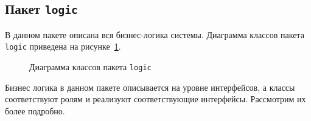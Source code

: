 	\subsection{Пакет \texttt{logic}}
	В данном пакете описана вся бизнес-логика системы. Диаграмма классов пакета \texttt{logic} приведена на рисунке~\ref{fig:logicDiagram}.
	\begin{figure}[h]
		\caption{Диаграмма классов пакета \texttt{logic}}
		\label{fig:logicDiagram}
	\end{figure}
	
	Бизнес логика в данном пакете описывается на уровне интерфейсов, а классы соответствуют ролям и реализуют соответствующие интерфейсы. Рассмотрим их более подробно.
	
